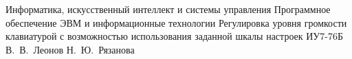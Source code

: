 \documentclass{bmstu}
\begin{document}
\makecourseworktitle
    {Информатика, искусственный интеллект и системы управления} %
    {Программное обеспечение ЭВМ и информационные технологии} %
    {Регулировка уровня громкости клавиатурой с возможностью использования заданной шкалы настроек} %
    {ИУ7-76Б} %
    {В.~В.~Леонов} %
    {Н.~Ю.~Рязанова} %
    {}
    {}
    
\setcounter{page}{3}
% 

\maketableofcontents








\makebibliography


\end{document}
